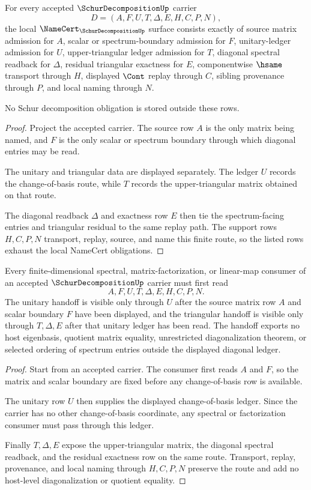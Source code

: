 \begin{theorem}
\label{thm:schur-decomposition-namecert-obligations}
For every accepted $\SchurDecompositionUp$ carrier
$$
D=(A,F,U,T,\Delta,E,H,C,P,N),
$$
the local $\NameCert_{\SchurDecompositionUp}$ surface consists exactly of source matrix admission for $A$, scalar or spectrum-boundary admission for $F$, unitary-ledger admission for $U$, upper-triangular ledger admission for $T$, diagonal spectral readback for $\Delta$, residual triangular exactness for $E$, componentwise $\hsame$ transport through $H$, displayed $\Cont$ replay through $C$, sibling provenance through $P$, and local naming through $N$.

No Schur decomposition obligation is stored outside these rows.
\end{theorem}
\begin{proof}
Project the accepted carrier. The source row $A$ is the only matrix being named, and $F$ is the only scalar or spectrum boundary through which diagonal entries may be read.

The unitary and triangular data are displayed separately. The ledger $U$ records the change-of-basis route, while $T$ records the upper-triangular matrix obtained on that route.

The diagonal readback $\Delta$ and exactness row $E$ then tie the spectrum-facing entries and triangular residual to the same replay path. The support rows $H,C,P,N$ transport, replay, source, and name this finite route, so the listed rows exhaust the local NameCert obligations.
\end{proof}

\begin{theorem}
\label{thm:schur-decomposition-unitary-triangular-handoff}
Every finite-dimensional spectral, matrix-factorization, or linear-map consumer of an accepted $\SchurDecompositionUp$ carrier must first read
$$
A,F,U,T,\Delta,E,H,C,P,N.
$$
The unitary handoff is visible only through $U$ after the source matrix row $A$ and scalar boundary $F$ have been displayed, and the triangular handoff is visible only through $T,\Delta,E$ after that unitary ledger has been read. The handoff exports no host eigenbasis, quotient matrix equality, unrestricted diagonalization theorem, or selected ordering of spectrum entries outside the displayed diagonal ledger.
\end{theorem}
\begin{proof}
Start from an accepted carrier. The consumer first reads $A$ and $F$, so the matrix and scalar boundary are fixed before any change-of-basis row is available.

The unitary row $U$ then supplies the displayed change-of-basis ledger. Since the carrier has no other change-of-basis coordinate, any spectral or factorization consumer must pass through this ledger.

Finally $T,\Delta,E$ expose the upper-triangular matrix, the diagonal spectral readback, and the residual exactness row on the same route. Transport, replay, provenance, and local naming through $H,C,P,N$ preserve the route and add no host-level diagonalization or quotient equality.
\end{proof}

